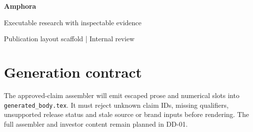 \documentclass[11pt,letterpaper]{article}
\begin{document}
{\Huge\bfseries Amphora}\par
{\Large Executable research with inspectable evidence}\par
\textcolor{AmphoraTeal}{Publication layout scaffold | Internal review}

\section*{Generation contract}
The approved-claim assembler will emit escaped prose and numerical slots into
\texttt{generated_body.tex}. It must reject unknown claim IDs, missing qualifiers,
unsupported release status and stale source or brand inputs before rendering.
The full assembler and investor content remain planned in DD-01.

\end{document}

